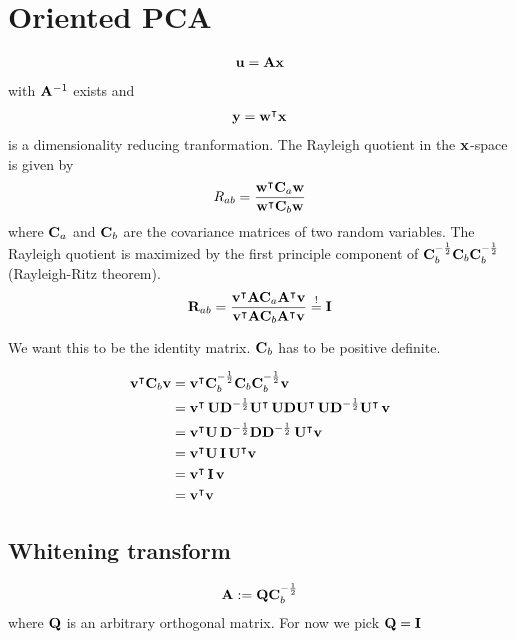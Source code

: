 \section{Oriented PCA}

\begin{align*}
	\mathbf{u} = \mathbf{A x} 
\end{align*}
with $\mathbf{A}^{-1}$ exists and %
\begin{align*}
	\mathbf{y} = \mathbf{w^\intercal x}
\end{align*}
is a dimensionality reducing tranformation.
The  Rayleigh quotient in the $\mathbf{x}$-space is given by
\begin{align}
	R_{ab} = \frac{\mathbf{w}^\intercal \mathbf{C}_a \mathbf{w}}{\mathbf{w}^\intercal \mathbf{C}_b \mathbf{w}}
\end{align}
where $\mathbf{C}_a$ and $\mathbf{C}_b$ are the covariance matrices of two random variables. The Rayleigh
quotient is maximized by the first principle component of 
$\mathbf{C}_b^{-\frac{1}{2}} \mathbf{C}_b \mathbf{C}_b^{-\frac{1}{2}}$ (Rayleigh-Ritz theorem).
\begin{align}
	\mathbf{R}_{ab} = \frac{\mathbf{v}^\intercal \mathbf{A} \mathbf{C}_a \mathbf{A}^\intercal \mathbf{v}}{\mathbf{v}^\intercal \mathbf{A} \mathbf{C}_b \mathbf{A}^\intercal \mathbf{v}}
	\stackrel{!}{=} \operatorname{\mathbf{I}}
\end{align}

We want this to be the identity matrix. $\mathbf{C}_b$ has to be positive definite.

\begin{align}
	\begin{split}
	\mathbf{v}^\intercal \mathbf{C}_b \mathbf{v} 
		&= \mathbf{v}^\intercal \mathbf{C}_b^{-\frac{1}{2}} \mathbf{C}_b \mathbf{C}_b^{-\frac{1}{2}} \mathbf{v} \\
		&= \mathbf{v}^\intercal \, \mathbf{U} \mathbf{D}^{-\frac{1}{2}} \mathbf{U}^\intercal \, \mathbf{U} \mathbf{D} 
		   \mathbf{U}^\intercal \, \mathbf{U} \mathbf{D}^{-\frac{1}{2}} \mathbf{U}^\intercal \, \mathbf{v} \\
 		&= \mathbf{v}^\intercal \mathbf{U} \, \mathbf{D}^{-\frac{1}{2}} \mathbf{D} \mathbf{D}^{-\frac{1}{2}} \, \mathbf{U}^\intercal \mathbf{v} \\
 		&= \mathbf{v}^\intercal \mathbf{U} \operatorname{\mathbf{I}} \mathbf{U}^\intercal \mathbf{v} \\
 		&= \mathbf{v}^\intercal \operatorname{\mathbf{I}} \mathbf{v} \\
 		&= \mathbf{v}^\intercal \mathbf{v}
	\end{split} 		
\end{align}

\subsection{Whitening transform}
\begin{align}
	\mathbf{A} := \mathbf{Q} \mathbf{C}_b^{-\frac{1}{2}}
\end{align}
where $\mathbf{Q}$ is an arbitrary orthogonal matrix. For now we pick $\mathbf{Q} = \operatorname{\mathbf{I}}$

